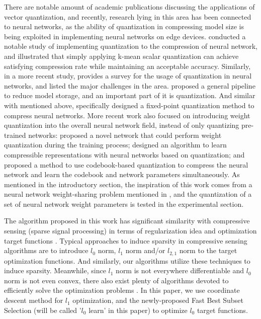 \documentclass[preprint,10pt]{elsarticle}
\begin{document}
There are notable amount of academic publications discussing the applications of vector quantization, and recently, research lying in this area has been connected to neural networks, as the ability of quantization in compressing model size is being exploited in implementing neural networks on edge devices. \cite{gong2014compressing} conducted a notable study of implementing quantization to the compression of neural network, and illustrated that simply applying k-mean scalar quantization can achieve satisfying compression rate while maintaining an acceptable accuracy. Similarly, in a more recent study, \cite{guo2018survey} provides a survey for the usage of quantization in neural networks, and listed the major challenges in the area. \cite{SongHan2015NetworkCompression} proposed a general pipeline to reduce model storage, and an important part of it is quantization. And similar with \cite{2017_compression_1992idea} mentioned above, \cite{FixedPointQuantizationNetwork} specifically designed a fixed-point quantization method to compress neural networks. More recent work also focused on introducing weight quantization into the overall neural network field, instead of only quantizing pre-trained networks: \cite{hubara2017quantizationDuringTraining} proposed a novel network that could perform weight quantization during the training process; \cite{agustsson2017quantizationrepresentation} designed an algorithm to learn compressible representations with neural networks based on quantization; and \cite{carreira2017model} proposed a method to use codebook-based quantization to compress the neural network and learn the codebook and network parameters simultaneously. As mentioned in the introductory section, the inspiration of this work comes from a neural network weight-sharing problem mentioned in \cite{EmbeddedDeepLearningThesis}, and the quantization of a set of neural network weight parameters is tested in the experimental section. \par
The algorithm proposed in this work has significant similarity with compressive sensing (sparse signal processing) in terms of regularization idea and optimization target functions \cite{SparseCompressionTypical,SparseCompressionTypical2,SparseCompressionTypical3}. Typical approaches to induce sparsity in compressive sensing algorithms are to introduce $l_0$ norm\cite{l0SignalProcessing}, $l_1$ norm \cite{LassoRetirevePaper,LassoCompressiveSensing} and/or $l_{2,1}$ norm \cite{l21CompressiveSensing} to the target optimization functions. And similarly, our algorithms utilize these techniques to induce sparsity. Meanwhile, since $l_1$ norm is not everywhere differentiable and $l_0$ norm is not even convex, there also exist plenty of algorithms devoted to efficiently solve the optimization problems \cite{l1OptimizationAlgorithm,l0OptimizationAlgorithm,CoordinateDescentPaper}. In this paper, we use coordinate descent method for $l_1$ optimization, and the newly-proposed Fast Best Subset Selection \cite{l0Learn2018Hazimeh} (will be called '$l_0$ learn' in this paper) to optimize $l_0$ target functions.
\end{document}
